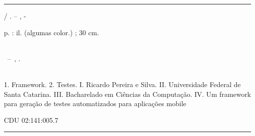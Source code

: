 \documentclass[
    12pt,       %
    openright,      %
    twoside,      %
    a4paper,      %
    english,      %
    french,       %
    spanish,      %
    brazil,       %
    ]{abntex2}
\begin{document}
  \frenchspacing


  \imprimircapa

  \imprimirfolhaderosto*


  \begin{fichacatalografica}
    \vspace*{\fill}         %
    \hrule              %
    \begin{center}          %
    \begin{minipage}[c]{12.5cm}   %

    \imprimirautor

    \hspace{0.5cm} \imprimirtitulo  / \imprimirautor. --
    \imprimirlocal, \imprimirdata-

    \hspace{0.5cm} \pageref{LastPage} p. : il. (algumas color.) ; 30 cm.\\

    \hspace{0.5cm} \imprimirorientadorRotulo~\imprimirorientador\\

    \hspace{0.5cm}
    \parbox[t]{\textwidth}{\imprimirtipotrabalho~--~\imprimirinstituicao,
    \imprimirdata.}\\

    \hspace{0.5cm}
      1. Framework.
      2. Testes.
      I. Ricardo Pereira e Silva.
      II. Universidade Federal de Santa Catarina.
      III. Bacharelado em Ciências da Computação.
      IV. Um framework para geração de testes automatizados para aplicações mobile

    \hspace{8.75cm} CDU 02:141:005.7\\

    \end{minipage}
    \end{center}
    \hrule
  \end{fichacatalografica}
\end{document}
